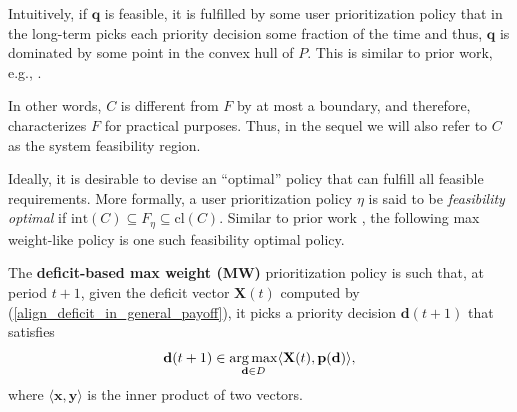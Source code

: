 \documentclass[prodmode,acmtompecs]{acmsmall}
\newcommand{\reqvec}{\mathbf{q}}
\newcommand{\feasibilityRegion}{F}
\newcommand{\myComments}[1]{}
\newif\ifinfocom
\newif\ifextended
\newcommand{\infocomStart}{\ifinfocom \myComments{Infocom: }}
\newcommand{\extendedStart}{\ifextended  \myComments{Extended version: }}
\newcommand{\commentEnd}{\myComments{End}}
\begin{document}
Intuitively, if $\reqvec$ is feasible, it is fulfilled by some user prioritization policy that in the long-term picks each priority decision some fraction of the time and thus, $\reqvec$ is dominated by some point in the convex hull of $P$. This is similar to prior work, e.g., \cite{TaE92}. 
\infocomStart
See the extended version of this paper \cite{EXT2} for the proof. 
\commentEnd\fi
\extendedStart
See the appendix for a detailed proof. 
\commentEnd\fi
In other words, $C$ is different from $\feasibilityRegion$ by at most a boundary, and therefore, characterizes $\feasibilityRegion$ for practical purposes. Thus, in the sequel we will also refer to $C$ as the system feasibility region. 

Ideally, it is desirable to devise an ``optimal'' policy that can fulfill all feasible requirements. 
More formally, a user prioritization policy $\eta$ is said to be {\em feasibility optimal} if $\text{int}(C) \subseteq \feasibilityRegion_{\eta} \subseteq \text{cl}(C)$. 
Similar to prior work \cite{TaE92,TaE93}, the following max weight-like policy is one such feasibility optimal policy. 

\begin{definition}
The {\bf deficit-based max weight (MW)} prioritization policy is such that, at period $t+1$, given the deficit vector $\mathbf{X}(t)$ computed by (\ref{align_deficit_in_general_payoff}), it picks a priority decision $\mathbf{d}(t+1)$ that satisfies
\begin{align}
\label{align_max_weight}
\mathbf{d}(t+1) \in \operatorname*{arg\,max}\limits_{\mathbf{d} \in D}\langle \mathbf{X}(t), \mathbf{p}(\mathbf{d}) \rangle, 
\end{align}
where $\langle \mathbf{x}, \mathbf{y}\rangle$ is the inner product of two vectors. 
\end{definition}


\begin{theorem}
\label{theorem_MW_feasibility_optimal}
\infocomStart
The feasibility region of the MW policy $\feasibilityRegion_{\text{MW}}$ is such that 
$$
\text{int}(C) \subseteq \feasibilityRegion_{MW} \subseteq \text{cl}(C), 
$$
and therefore, the MW policy is feasibility optimal. 
\commentEnd\fi
\extendedStart
The system feasibility region $\feasibilityRegion$ and the feasibility region of the MW policy $\feasibilityRegion_{\textnormal{MW}}$ are related to $C$ as follows, 
$$
\textnormal{int}(C) \subseteq \feasibilityRegion_{\textnormal{MW}} \subseteq \feasibilityRegion \subseteq \textnormal{cl}(C), 
$$
and therefore, the MW policy is feasibility optimal. 
\commentEnd\fi
\end{theorem}
\end{document}
